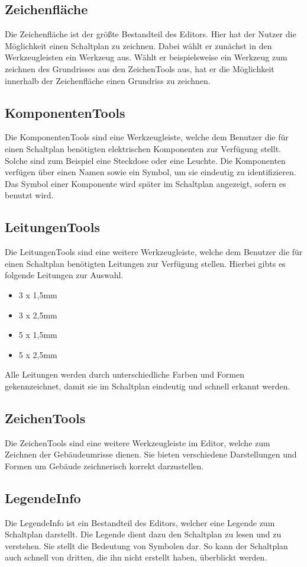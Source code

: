 \subsection{Zeichenfläche}
Die Zeichenfläche ist der größte Bestandteil des Editors. Hier hat der Nutzer die Möglichkeit einen Schaltplan zu zeichnen. Dabei wählt er zunächst in den Werkzeugleisten ein Werkzeug aus. Wählt er beispielsweise ein Werkzeug zum zeichnen des Grundrisses aus den ZeichenTools aus, hat er die Möglichkeit innerhalb der Zeichenfläche einen Grundriss zu zeichnen. 
\subsection{KomponentenTools}
Die KomponentenTools sind eine Werkzeugleiste, welche dem Benutzer die für einen Schaltplan benötigten elektrischen Komponenten zur Verfügung stellt. Solche sind zum Beispiel eine Steckdose oder eine Leuchte. Die Komponenten verfügen über einen Namen sowie ein Symbol, um sie eindeutig zu identifizieren. Das Symbol einer Komponente wird später im Schaltplan angezeigt, sofern es benutzt wird.
\subsection{LeitungenTools}
Die LeitungenTools sind eine weitere Werkzeugleiste, welche dem Benutzer die für einen Schaltplan benötigten Leitungen zur Verfügung stellen. Hierbei gibts es folgende Leitungen zur Auswahl. 
\begin{itemize}
    \item 3 x 1,5mm 
    \item 3 x 2,5mm
    \item 5 x 1,5mm
    \item 5 x 2,5mm
\end{itemize}
Alle Leitungen werden durch unterschiedliche Farben und Formen gekennzeichnet, damit sie im Schaltplan eindeutig und schnell erkannt werden. 
\subsection{ZeichenTools}
Die ZeichenTools sind eine weitere Werkzeugleiste im Editor, welche zum Zeichnen der Gebäudeumrisse dienen. Sie bieten verschiedene Darstellungen und Formen um Gebäude zeichnerisch korrekt darzustellen.
\subsection{LegendeInfo}
Die LegendeInfo ist ein Bestandteil des Editors, welcher eine Legende zum Schaltplan darstellt. Die Legende dient dazu den Schaltplan zu lesen und zu verstehen. Sie stellt die Bedeutung von Symbolen dar. So kann der Schaltplan auch schnell von dritten, die ihn nicht erstellt haben, überblickt werden.

